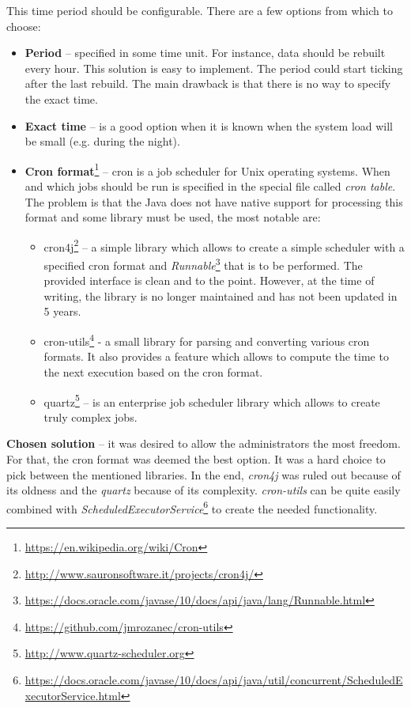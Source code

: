 This time period should be configurable. There are a few options from which to choose:
\begin{itemize}
    \item \textbf{Period} – specified in some time unit. For instance, data should be rebuilt every hour. This solution
    is easy to implement. The period could start ticking after the last rebuild. The main drawback is that there is no way to specify the exact time.
    \item \textbf{Exact time} – is a good option when it is known when the system load will be small (e.g. during the night).
    \item \textbf{Cron format}\footnote{\url{https://en.wikipedia.org/wiki/Cron}} – \label{cron} cron is a job scheduler for Unix
    operating systems. When and which jobs should be run is specified in the special file called \textit{cron table}. The problem
    is that the Java does not have native support for processing this format and some library must be used, the most notable are:
    \begin{itemize}
        \item cron4j\footnote{\url{http://www.sauronsoftware.it/projects/cron4j/}} – a simple library which allows to
        create a simple scheduler with a specified cron format and
        \textit{Runnable}\footnote{\url{https://docs.oracle.com/javase/10/docs/api/java/lang/Runnable.html}} that is to be performed.
        The provided interface is clean and to the point. However, at the time of writing, the library is no longer maintained and
        has not been updated in 5 years.
        \item cron-utils\footnote{\url{https://github.com/jmrozanec/cron-utils}} - a small library for parsing and
        converting various cron formats. It also provides a feature which allows to compute the time to the next execution
        based on the cron format.
        \item quartz\footnote{\url{http://www.quartz-scheduler.org}} – is an enterprise job scheduler library which
        allows to create truly complex jobs.
    \end{itemize}
\end{itemize}

\textbf{Chosen solution} – it was desired to allow the administrators the most freedom. For that, the cron format was
deemed the best option. It was a hard choice to pick between the mentioned libraries. In the end, \textit{cron4j} was ruled out
because of its oldness and the \textit{quartz} because of its complexity. \textit{cron-utils} can be quite easily combined with
\textit{ScheduledExecutorService}\footnote{\url{https://docs.oracle.com/javase/10/docs/api/java/util/concurrent/ScheduledExecutorService.html}}
to create the needed functionality.

